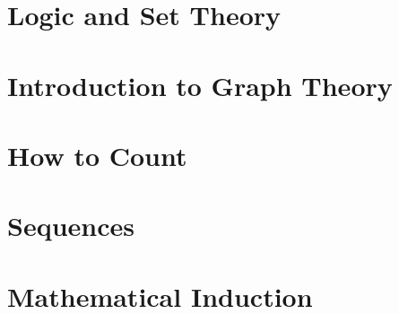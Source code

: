 \documentclass[12pt, oneside]{book}
\begin{document}




%


\chapter[Logic]{Logic and Set Theory}


%


%

\chapter[Graph Theory]{Introduction to Graph Theory}




\chapter[Counting]{How to Count}


%


%


%


\chapter[Sequences]{Sequences}


%


%


\chapter[Induction]{Mathematical Induction}



\end{document}
